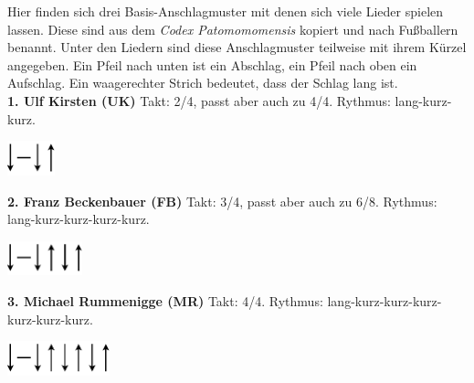 \begin{intersong}
    \newpage\null
    \begin{center}
    \end{center}
    Hier finden sich drei Basis-Anschlagmuster mit denen sich viele Lieder spielen lassen. Diese sind aus dem \textit{Codex Patomomomensis} kopiert und nach Fußballern benannt. Unter den Liedern sind diese Anschlagmuster teilweise mit ihrem Kürzel angegeben. Ein Pfeil nach unten ist ein Abschlag, ein Pfeil nach oben ein Aufschlag. Ein waagerechter Strich bedeutet, dass der Schlag lang ist. \\
    
    \noindent\textbf{1. Ulf Kirsten (UK)} \newline
    Takt: 2/4, passt aber auch zu 4/4. Rythmus: lang-kurz-kurz.
    \begin{center}
        \includegraphics[height=1cm]{Misc/Schlagmuster/Schm-UK.pdf}
    \end{center}
    
    \noindent\textbf{2. Franz Beckenbauer (FB)} \newline
    Takt: 3/4, passt aber auch zu 6/8. Rythmus: lang-kurz-kurz-kurz-kurz.
    \begin{center}
        \includegraphics[height=1cm]{Misc/Schlagmuster/Schm-FB.pdf}
    \end{center}
    
    \noindent\textbf{3. Michael Rummenigge (MR)} \newline
    Takt: 4/4. Rythmus: lang-kurz-kurz-kurz-kurz-kurz-kurz.
    \begin{center}
        \includegraphics[height=1cm]{Misc/Schlagmuster/Schm-MR.pdf}
    \end{center}
    

\end{intersong}